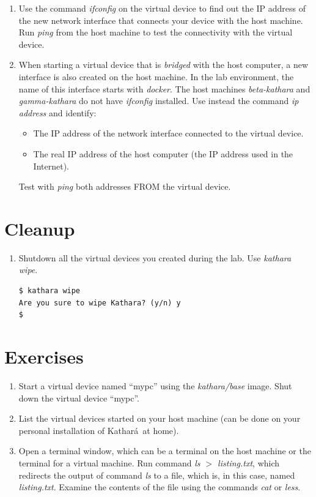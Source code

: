 \documentclass[12pt]{book}
\newcommand{\kathara}{Kathar\'a}
\begin{document}
\begin{enumerate}[label=\arabic*.]
\begin{enumerate}[resume*]
\item Use the command \emph{ifconfig} on the virtual device to find out the IP address of the new network interface that connects your device with the host machine. Run \emph{ping} from the host machine to test the connectivity with the virtual device. 

\item When starting a virtual device that is \emph{bridged} with the host computer, a new interface is also created on the host machine. In the lab environment, the name of this interface starts with \emph{docker}. The host machines \emph{beta-kathara} and \emph{gamma-kathara} do not have \emph{ifconfig} installed. Use instead the command \emph{ip address} and identify:
\begin{itemize}[label=-]
\item The IP address of the network interface connected to the virtual device.
\item The real IP address of the host computer (the IP address used in the Internet).
\end{itemize}
Test with \emph{ping} both addresses FROM the virtual device. 
\end{enumerate}

\section{Cleanup}

\begin{enumerate}[resume*]
\item Shutdown all the virtual devices you created during the lab. Use \emph{kathara wipe}.

\begin{lstlisting}
$ kathara wipe
Are you sure to wipe Kathara? (y/n) y
$ 
\end{lstlisting}
\end{enumerate}

\section{Exercises}

\begin{enumerate}[label=\arabic*.]
\item Start a virtual device named ``mypc'' using the \emph{kathara/base} image. Shut down the virtual device ``mypc''.
\item List the virtual devices started on your host machine (can be done on your personal installation of \kathara\ at home).
\item\label{redirect} Open a terminal window, which can be a terminal
  on the host machine or the terminal for a virtual machine. Run
  command \emph{ls $>$ listing.txt}, which redirects the output of command \emph{ls} to a file, which is, in this case, named \emph{listing.txt}. Examine the contents of the file using the commands \emph{cat} or \emph{less}. 


\end{enumerate}
\end{enumerate}
\end{document}

